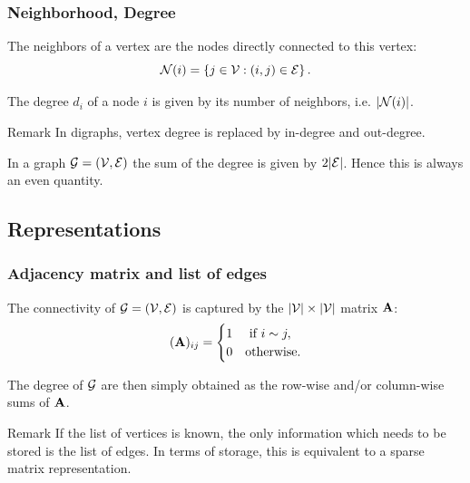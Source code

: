 \documentclass{beamer}\usepackage[]{graphicx}\usepackage[]{color}
\begin{document}
\begin{frame}
  \frametitle{Neighborhood, Degree}

  \begin{definition}[Neighborhood]
    The neighbors of a vertex are the nodes directly connected to this vertex:
    \[
      \mathcal{N}(i) = \left\{j\in\mathcal{V} : (i,j) \in \mathcal{E}\right\}.
    \]
  \end{definition}
  
  \begin{definition}[Degree]
    The degree $d_i$ of a node $i$ is given by its number of neighbors, i.e. $|\mathcal{N}(i)|$.
  \end{definition}

  \begin{block}{Remark}
    In digraphs, vertex degree is replaced by \alert{in-degree} and \alert{out-degree}.
  \end{block}

  \begin{proposition}
    In a graph $\mathcal{G} = (\mathcal{V},\mathcal{E})$ the sum of the degree is given by $2|\mathcal{E}|$. Hence \alert{this is always an even quantity}.
  \end{proposition}
  
  
\end{frame}

\subsection{Representations}

\begin{frame}
  \frametitle{Adjacency matrix and list of edges}

  \begin{definition}
    The connectivity of  $\mathcal{G} = (\mathcal{V},\mathcal{E})$ is captured by the $|\mathcal{V}|\times |\mathcal{V}|$ matrix $\mathbf{A}$:
    \[
      (\mathbf{A})_{ij} = \begin{cases}
      1  & \text{ if } i \sim j,\\
      0  & \text{otherwise}.
      \end{cases}
    \]
  \end{definition}

  \begin{proposition}
    The degree of $\mathcal{G}$ are then simply obtained as the row-wise and/or column-wise sums of $\mathbf{A}$.
  \end{proposition}

  \begin{block}{Remark}
    If the list of vertices is known, the only information which needs to be stored is the list of edges. In terms of storage, this is equivalent to a sparse matrix representation.
  \end{block}
  
\end{frame}
\end{document}

